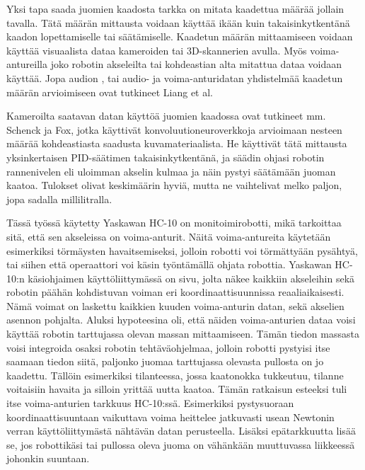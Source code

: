 Yksi tapa saada juomien kaadosta tarkka on mitata kaadettua määrää jollain tavalla. Tätä määrän mittausta voidaan käyttää ikään kuin takaisinkytkentänä kaadon lopettamiselle tai säätämiselle. Kaadetun määrän mittaamiseen voidaan käyttää visuaalista dataa kameroiden tai 3D-skannerien avulla. Myös voima-antureilla joko robotin akseleilta tai kohdeastian alta mitattua dataa voidaan käyttää. Jopa audion \cite{Liang2019}, tai audio- ja voima-anturidatan yhdistelmää \cite{Liang2020} kaadetun määrän arvioimiseen ovat tutkineet Liang et al.

Kameroilta saatavan datan käyttöä juomien kaadossa ovat tutkineet mm. Schenck ja Fox, jotka käyttivät konvoluutioneuroverkkoja arvioimaan nesteen määrää kohdeastiasta saadusta kuvamateriaalista. He käyttivät tätä mittausta yksinkertaisen PID-säätimen takaisinkytkentänä, ja säädin ohjasi robotin rannenivelen eli uloimman akselin kulmaa ja näin pystyi säätämään juoman kaatoa. Tulokset olivat keskimäärin hyviä, mutta ne vaihtelivat melko paljon, jopa sadalla millilitralla. \cite{Schenck2016}

Tässä työssä käytetty Yaskawan HC-10 on monitoimirobotti, mikä tarkoittaa sitä, että sen akseleissa on voima-anturit. Näitä voima-antureita käytetään esimerkiksi törmäysten havaitsemiseksi, jolloin robotti voi törmättyään pysähtyä, tai siihen että operaattori voi käsin työntämällä ohjata robottia. Yaskawan HC-10:n käsiohjaimen käyttöliittymässä on sivu, jolta näkee kaikkiin akseleihin sekä robotin päähän kohdistuvan voiman eri koordinaattisuunnissa reaaliaikaisesti. Nämä voimat on laskettu kaikkien kuuden voima-anturin datan, sekä akselien asennon pohjalta. \cite[s.10-11]{Yaskawa} Aluksi hypoteesina oli, että näiden voima-anturien dataa voisi käyttää robotin tarttujassa olevan massan mittaamiseen. Tämän tiedon massasta voisi integroida osaksi robotin tehtäväohjelmaa, jolloin robotti pystyisi itse saamaan tiedon siitä, paljonko juomaa tarttujassa olevasta pullosta on jo kaadettu. Tällöin esimerkiksi tilanteessa, jossa kaatonokka tukkeutuu, tilanne voitaisiin havaita ja silloin yrittää uutta kaatoa. Tämän ratkaisun esteeksi tuli itse voima-anturien tarkkuus HC-10:ssä. Esimerkiksi pystysuoraan koordinaattisuuntaan vaikuttava voima heittelee jatkuvasti usean Newtonin verran käyttöliittymästä nähtävän datan perusteella. Lisäksi epätarkkuutta lisää se, jos robottikäsi tai pullossa oleva juoma on vähänkään muuttuvassa liikkeessä johonkin suuntaan.

